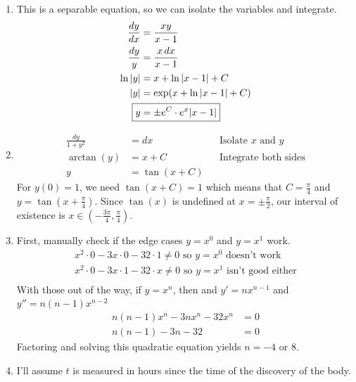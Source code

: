\documentclass[12pt]{article}
\begin{document}
\begin{enumerate}
          \pagebreak

    \item This is a separable equation, so we can isolate the variables and integrate.
          \begin{align*}
              \frac{dy}{dx} & =\frac{xy}{x-1}       \\
              \frac{dy}{y}  & =\frac{x\,dx}{x-1}    \\
              \ln |y|       & =x+\ln |x-1|+C        \\
              |y|           & =\exp(x+\ln |x-1|+C)  \\
              \Aboxed{y     & = \pm e^C \cdot e^x |x-1|}
          \end{align*}
    \item
          \begin{align*}
              \frac{dy}{1+y^2} & =dx        &  & \text{Isolate $x$ and $y$}  \\
              \arctan(y)       & =x+C       &  & \text{Integrate both sides} \\
              y                & =\tan(x+C)
          \end{align*}
          For $y(0)=1$, we need $\tan(x+C)=1$ which means that $C=\frac{\pi}{4}$ and $\boxed{y=\tan\left(x+\frac{\pi}{4}\right)}$.
          Since $\tan(x)$ is undefined at $x=\pm\frac{\pi}{2}$, our interval of existence is $\boxed{x \in \left(-\frac{3\pi}{4}, \frac{\pi}{4}\right)}$.
    \item First, manually check if the edge cases $y=x^0$ and $y=x^1$ work.
          \begin{gather*}
              x^2 \cdot 0 - 3x \cdot 0-32 \cdot 1 \ne 0\text{ so } y=x^0\text{ doesn't work}\\
              x^2 \cdot 0 - 3x \cdot 1 - 32 \cdot x \ne 0\text{ so }y=x^1\text{ isn't good either}\\
          \end{gather*} With those out of the way, if $y=x^n$, then and $y'=nx^{n-1}$ and $y''=n(n-1)x^{n-2}$
          \begin{align*}
              n(n-1)x^n-3nx^n-32x^n & =0 \\
              n(n-1)-3n-32          & =0
          \end{align*}
          Factoring and solving this quadratic equation yields $\boxed{n=-4\text{ or }8}$.
    \item I'll assume $t$ is measured in hours since the time of the discovery of the body.
          \begin{align*}

\end{align*}
\end{enumerate}
\end{document}
